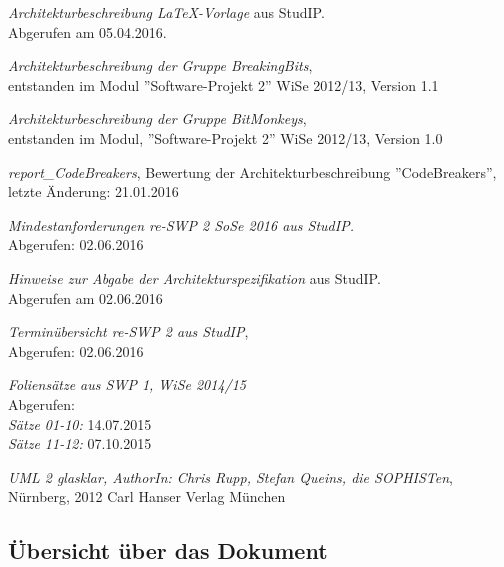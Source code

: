 \documentclass[fontsize=12pt,paper=a4,twoside]{scrartcl}
\begin{document}
\begin{compactenum}
\item \textit{Architekturbeschreibung \LaTeX-Vorlage} aus StudIP. \\ Abgerufen am 05.04.2016.
\item \textit{Architekturbeschreibung der Gruppe BreakingBits}, \\ entstanden im Modul ''Software-Projekt 2'' WiSe 2012/13, Version 1.1
\item \textit{Architekturbeschreibung der Gruppe BitMonkeys}, \\ entstanden im Modul, 
''Software-Projekt 2'' WiSe 2012/13, Version 1.0
\item \textit{report\_CodeBreakers}, Bewertung der Architekturbeschreibung ''CodeBreakers'',\\ letzte Änderung: 21.01.2016
\item \textit{Mindestanforderungen re-SWP 2 SoSe 2016 aus StudIP.} \\ Abgerufen: 02.06.2016
\item \textit{Hinweise zur Abgabe der Architekturspezifikation} aus StudIP. \\ Abgerufen am 02.06.2016
\item \textit{Terminübersicht re-SWP 2 aus StudIP}, \\ Abgerufen: 02.06.2016
\item \textit{Foliensätze aus SWP 1, WiSe 2014/15} \\ Abgerufen: \\ \textit{Sätze 01-10:} 14.07.2015 \\ \textit{Sätze 11-12:} 07.10.2015
\item \textit{UML 2 glasklar, AuthorIn: Chris Rupp, Stefan Queins, die SOPHISTen}, \\
Nürnberg, 2012 Carl Hanser Verlag München
\end{compactenum}
	
\subsection{Übersicht über das Dokument}
\end{document}
